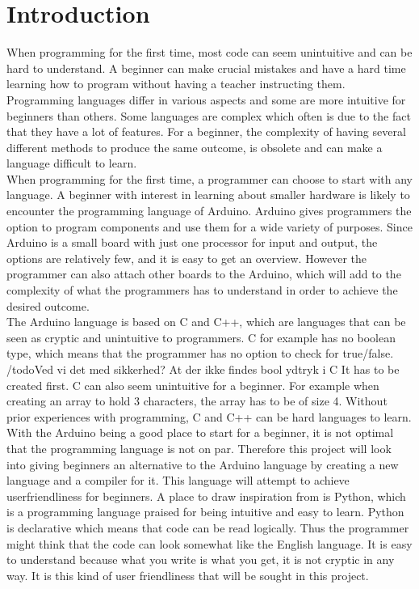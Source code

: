 \section{Introduction}
When programming for the first time, most code can seem unintuitive and can be hard to understand. A beginner can make crucial mistakes and have a hard time learning how to program without having a teacher instructing them.\\

Programming languages differ in various aspects and some are more intuitive for beginners than others. Some languages are complex which often is due to the fact that they have a lot of features. For a beginner, the complexity of having several different methods to produce the same outcome, is obsolete and can make a language difficult to learn. \\

When programming for the first time, a programmer can choose to start with any language. A beginner with interest in learning about smaller hardware is likely to encounter the programming language of Arduino. Arduino gives programmers the option to program components and use them for a wide variety of purposes. Since Arduino is a small board with just one processor for input and output, the options are relatively few, and it is easy to get an overview. However the programmer can also attach other boards to the Arduino, which will add to the complexity of what the programmers has to understand in order to achieve the desired outcome. \\

The Arduino language is based on C and C++, which are languages that can be seen as cryptic and unintuitive to programmers. C for example has no boolean type, which means that the programmer has no option to check for true/false. /todo{Ved vi det med sikkerhed? At der ikke findes bool ydtryk i C} It has to be created first. C can also seem unintuitive for a beginner. For example when creating an array to hold 3 characters, the array has to be of size 4.  Without prior experiences with programming, C and C++ can be hard languages to learn. \\

With the Arduino being a good place to start for a beginner, it is not optimal that the programming language is not on par.  Therefore this project will look into giving beginners an alternative to the Arduino language by creating a new language and a compiler for it. This language will attempt to achieve userfriendliness for beginners. A place to draw inspiration from is Python, which is a programming language praised for being intuitive and easy to learn.  Python is declarative which means that code can be read logically.  Thus the programmer might think that the code can look somewhat like the English language. It is easy to understand because what you write is what you get, it is not cryptic in any way. It is this kind of user friendliness that will be sought in this project.